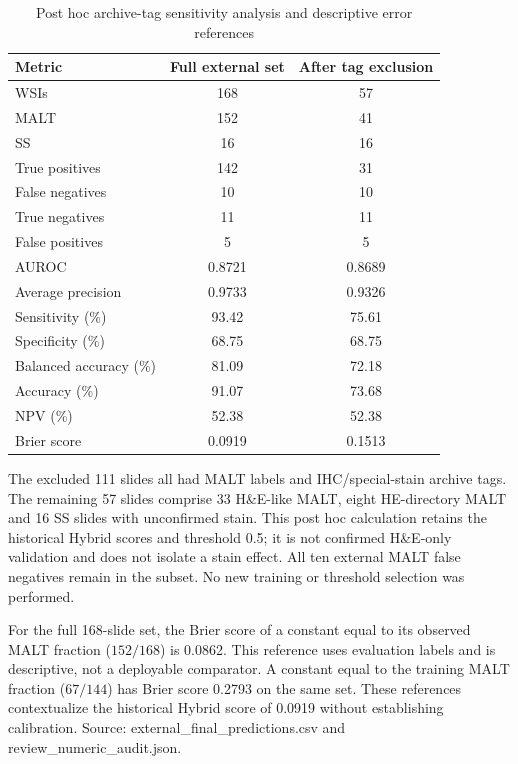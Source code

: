 \clearpage
\begin{table}[H]\centering
\caption{Post hoc archive-tag sensitivity analysis and descriptive error references}\label{tab:S18}
\small
\begin{tabularx}{\textwidth}{@{}>{\raggedright\arraybackslash}Xcc@{}}
\toprule
Metric & Full external set & After tag exclusion \\
\midrule
WSIs & 168 & 57 \\
MALT & 152 & 41 \\
SS & 16 & 16 \\
True positives & 142 & 31 \\
False negatives & 10 & 10 \\
True negatives & 11 & 11 \\
False positives & 5 & 5 \\
AUROC & 0.8721 & 0.8689 \\
Average precision & 0.9733 & 0.9326 \\
Sensitivity (\%) & 93.42 & 75.61 \\
Specificity (\%) & 68.75 & 68.75 \\
Balanced accuracy (\%) & 81.09 & 72.18 \\
Accuracy (\%) & 91.07 & 73.68 \\
NPV (\%) & 52.38 & 52.38 \\
Brier score & 0.0919 & 0.1513 \\
\bottomrule
\end{tabularx}
\par\medskip\footnotesize The excluded 111 slides all had MALT labels and IHC/special-stain archive tags. The remaining 57 slides comprise 33 H\&E-like MALT, eight HE-directory MALT and 16 SS slides with unconfirmed stain. This post hoc calculation retains the historical Hybrid scores and threshold 0.5; it is not confirmed H\&E-only validation and does not isolate a stain effect. All ten external MALT false negatives remain in the subset. No new training or threshold selection was performed.
\par\smallskip For the full 168-slide set, the Brier score of a constant equal to its observed MALT fraction ($152/168$) is 0.0862. This reference uses evaluation labels and is descriptive, not a deployable comparator. A constant equal to the training MALT fraction ($67/144$) has Brier score 0.2793 on the same set. These references contextualize the historical Hybrid score of 0.0919 without establishing calibration. Source: external\_final\_predictions.csv and review\_numeric\_audit.json.
\end{table}

